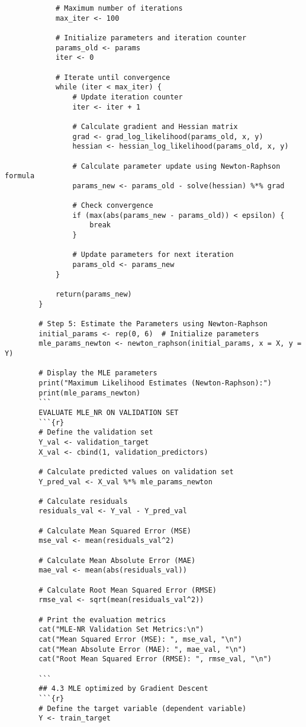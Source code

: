 \documentclass[12pt]{article}
\begin{document}
\begin{lstlisting}
			# Maximum number of iterations
			max_iter <- 100
			
			# Initialize parameters and iteration counter
			params_old <- params
			iter <- 0
			
			# Iterate until convergence
			while (iter < max_iter) {
				# Update iteration counter
				iter <- iter + 1
				
				# Calculate gradient and Hessian matrix
				grad <- grad_log_likelihood(params_old, x, y)
				hessian <- hessian_log_likelihood(params_old, x, y)
				
				# Calculate parameter update using Newton-Raphson formula
				params_new <- params_old - solve(hessian) %*% grad
				
				# Check convergence
				if (max(abs(params_new - params_old)) < epsilon) {
					break
				}
				
				# Update parameters for next iteration
				params_old <- params_new
			}
			
			return(params_new)
		}
		
		# Step 5: Estimate the Parameters using Newton-Raphson
		initial_params <- rep(0, 6)  # Initialize parameters
		mle_params_newton <- newton_raphson(initial_params, x = X, y = Y)
		
		# Display the MLE parameters
		print("Maximum Likelihood Estimates (Newton-Raphson):")
		print(mle_params_newton)
		```
		EVALUATE MLE_NR ON VALIDATION SET
		```{r}
		# Define the validation set
		Y_val <- validation_target
		X_val <- cbind(1, validation_predictors)
		
		# Calculate predicted values on validation set
		Y_pred_val <- X_val %*% mle_params_newton
		
		# Calculate residuals
		residuals_val <- Y_val - Y_pred_val
		
		# Calculate Mean Squared Error (MSE)
		mse_val <- mean(residuals_val^2)
		
		# Calculate Mean Absolute Error (MAE)
		mae_val <- mean(abs(residuals_val))
		
		# Calculate Root Mean Squared Error (RMSE)
		rmse_val <- sqrt(mean(residuals_val^2))
		
		# Print the evaluation metrics
		cat("MLE-NR Validation Set Metrics:\n")
		cat("Mean Squared Error (MSE): ", mse_val, "\n")
		cat("Mean Absolute Error (MAE): ", mae_val, "\n")
		cat("Root Mean Squared Error (RMSE): ", rmse_val, "\n")
		
		```
		## 4.3 MLE optimized by Gradient Descent 
		```{r}
		# Define the target variable (dependent variable)
		Y <- train_target
		

\end{lstlisting}
\end{document}
